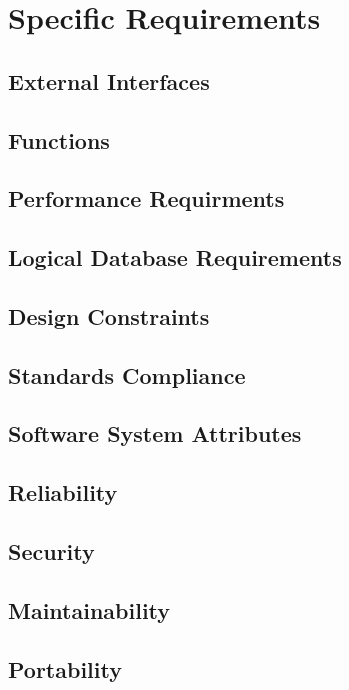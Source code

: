 \documentclass[draftclsnofoot, onecolumn, 10pt]{IEEEtran}
\begin{document}
\section{Specific Requirements}

\subsection{External Interfaces}

\subsection{Functions}

\subsection{Performance Requirments}

\subsection{Logical Database Requirements}

\subsection{Design Constraints}

\subsection{Standards Compliance}

\subsection{Software System Attributes}

\subsection{Reliability}

\subsection{Security}

\subsection{Maintainability}

\subsection{Portability}
\end{document}
